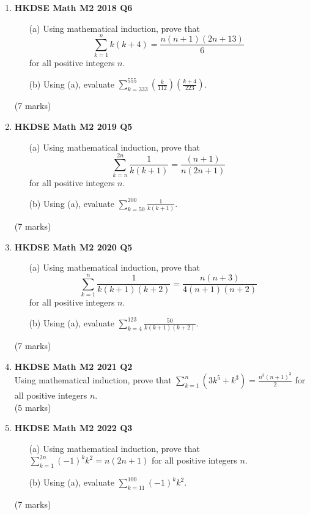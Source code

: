 \documentclass{report}
\begin{document}
\begin{enumerate}
	\newpage

	\item \textbf{HKDSE Math M2 2018 Q6}
	\begin{enumerate}
		\item [(a)]Using mathematical induction, prove that $$\displaystyle \sum_{k = 1}^{n} k(k+4) = \frac{n(n+1)(2n+13)}{6}$$ for all positive integers $n$.
		\item [(b)] Using (a), evaluate $\displaystyle \sum_{k = 333}^{555} \left(\frac{k}{112}\right)\left(\frac{k+4}{223}\right)$.
	\end{enumerate}
	(7 marks)

	\item\textbf{HKDSE Math M2 2019 Q5}
	\begin{enumerate}
		\item [(a)] Using mathematical induction, prove that $$\displaystyle \sum_{k = n}^{2n} \frac{1}{k(k+1)} = \frac{(n+1)}{n(2n+1)}$$ for all positive integers $n$.
		\item [(b)] Using (a), evaluate $\displaystyle \sum_{k = 50}^{200} \frac{1}{k(k+1)}$.
	\end{enumerate}
	(7 marks)

	\item \textbf{HKDSE Math M2 2020 Q5}
	\begin{enumerate}
		\item [(a)]Using mathematical induction, prove that $$\displaystyle \sum_{k = 1}^{n} \frac{1}{k(k+1)(k+2)} = \frac{n(n+3)}{4(n+1)(n+2)}$$ for all positive integers $n$.
		\item [(b)] Using (a), evaluate $\displaystyle \sum_{k = 4}^{123} \frac{50}{k(k+1)(k+2)}$.
	\end{enumerate}
	(7 marks)

	\item \textbf{HKDSE Math M2 2021 Q2}\\
	Using mathematical induction, prove that $\displaystyle \sum_{k = 1}^{n} (3k^{5} + k^{3}) = \frac{n^{3} (n+1)^{3}}{2}$ for all positive integers $n$. \\
	(5 marks)

	\item \textbf{HKDSE Math M2 2022 Q3}
	\begin{enumerate}
		\item [(a)]Using mathematical induction, prove that $\displaystyle \sum_{k = 1}^{2n} (-1)^k k^2 = n(2n+1)$ for all positive integers $n$.
		\item [(b)] Using (a), evaluate $\displaystyle \sum_{k = 11}^{100} (-1)^k k^2$. 
	\end{enumerate}
	(7 marks)


\end{enumerate}
\end{document}
